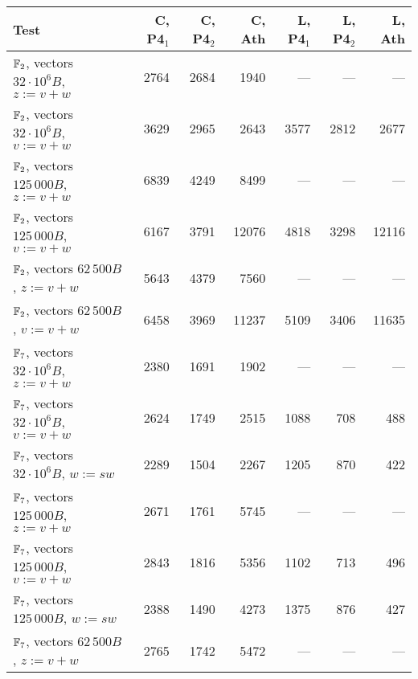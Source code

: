 \begin{table}[ht]
\begin{center}
\begin{tabular}{|l|r|r|r|r|r|r|}
\hline
Test            & C, P4$_1$ & C, P4$_2$ & C, Ath & 
                  L, P4$_1$  & L, P4$_2$  & L, Ath \\
\hline
\hline
$\mathbb{F}_2$, vectors $32\cdot 10^6 B$, $z := v+w$ 
& 2764 & 2684 & 1940 & ---  & --- & --- \\
\hline                                                    
$\mathbb{F}_2$, vectors $32\cdot 10^6 B$, $v := v+w$ 
& 3629 & 2965 & 2643 & 3577 & 2812 & 2677 \\
\hline                                                    
$\mathbb{F}_2$, vectors $125\,000 B$, $z := v+w$     
& 6839 & 4249 & 8499 & ---  & --- & --- \\
\hline                                                    
$\mathbb{F}_2$, vectors $125\,000 B$, $v := v+w$     
& 6167 & 3791 &12076 & 4818 & 3298 & 12116 \\
\hline                                                    
$\mathbb{F}_2$, vectors $62\,500 B$, $z := v+w$      
& 5643 & 4379 & 7560 & ---  & --- & --- \\
\hline
$\mathbb{F}_2$, vectors $62\,500 B$, $v := v+w$      
& 6458 & 3969 &11237 & 5109 & 3406 &11635 \\
\hline                                                    
\hline
$\mathbb{F}_7$, vectors $32\cdot 10^6 B$, $z := v+w$ 
& 2380 & 1691 & 1902 & ---  & --- & --- \\
\hline
$\mathbb{F}_7$, vectors $32\cdot 10^6 B$, $v := v+w$ 
& 2624 & 1749 & 2515 & 1088 & 708 & 488  \\
\hline                                                    
$\mathbb{F}_7$, vectors $32\cdot 10^6 B$, $w := sw$  
& 2289 & 1504 & 2267 & 1205 & 870 & 422  \\
\hline                                                    
$\mathbb{F}_7$, vectors $125\,000 B$, $z := v+w$     
& 2671 & 1761 & 5745 & ---  & --- & --- \\
\hline
$\mathbb{F}_7$, vectors $125\,000 B$, $v := v+w$     
& 2843 & 1816 & 5356 & 1102 & 713 & 496  \\
\hline                                                    
$\mathbb{F}_7$, vectors $125\,000 B$, $w := sw$      
& 2388 & 1490 & 4273 & 1375 & 876 & 427  \\
\hline                                                    
$\mathbb{F}_7$, vectors $62\,500 B$, $z := v+w$      
& 2765 & 1742 & 5472 & ---  & --- & --- \\

\end{tabular}
\end{center}
\end{table}
